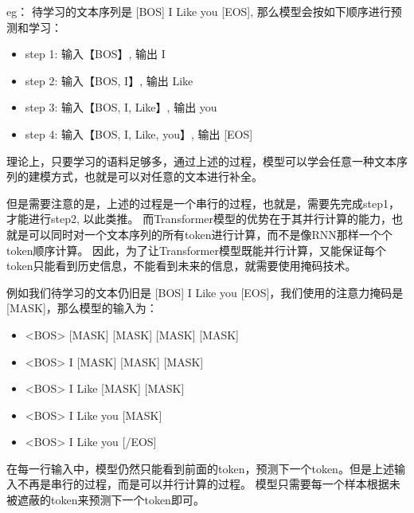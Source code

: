 \documentclass{article}
\begin{document}
eg： 待学习的文本序列是 [BOS] I Like you [EOS], 那么模型会按如下顺序进行预测和学习：
\begin{itemize}
    \item step 1: 输入【BOS】, 输出 I 
    \item step 2: 输入【BOS, I】, 输出 Like
    \item step 3: 输入【BOS, I, Like】, 输出 you
    \item   step 4: 输入【BOS, I, Like, you】, 输出 [EOS]
\end{itemize}

理论上，只要学习的语料足够多，通过上述的过程，模型可以学会任意一种文本序列的建模方式，也就是可以对任意的文本进行补全。

但是需要注意的是，上述的过程是一个串行的过程，也就是，需要先完成step1，才能进行step2, 以此类推。
而Transformer模型的优势在于其并行计算的能力，也就是可以同时对一个文本序列的所有token进行计算，而不是像RNN那样一个个token顺序计算。
因此，为了让Transformer模型既能并行计算，又能保证每个token只能看到历史信息，不能看到未来的信息，就需要使用掩码技术。

例如我们待学习的文本仍旧是 [BOS] I Like you [EOS]，我们使用的注意力掩码是[MASK]，那么模型的输入为：
\begin{itemize}
    \item <BOS> [MASK] [MASK] [MASK] [MASK]
    \item <BOS> I [MASK] [MASK] [MASK]
    \item <BOS> I Like [MASK] [MASK]
    \item <BOS> I Like you [MASK]
    \item <BOS> I Like you [/EOS]
\end{itemize}

在每一行输入中，模型仍然只能看到前面的token，预测下一个token。但是上述输入不再是串行的过程，而是可以并行计算的过程。
模型只需要每一个样本根据未被遮蔽的token来预测下一个token即可。
% 
\end{document}
